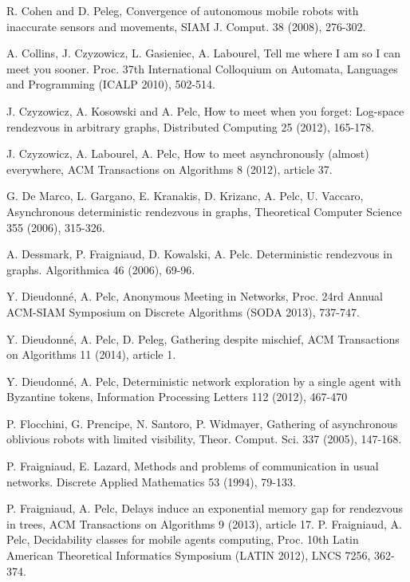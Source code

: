 \documentclass [11pt] {article}
\begin{document}
\begin{thebibliography}{99}
R. Cohen and D. Peleg, 
Convergence of autonomous mobile robots with inaccurate sensors and movements, 
SIAM J. Comput. 38 (2008), 276-302. 



A. Collins, J. Czyzowicz, L. Gasieniec, A. Labourel,
Tell me where I am so I can meet you sooner.
Proc. 37th International Colloquium on Automata, Languages and Programming (ICALP 2010), 502-514.

J. Czyzowicz, A. Kosowski and A. Pelc,
How to meet when you forget:  Log-space rendezvous in arbitrary graphs,
Distributed Computing 25 (2012), 165-178.

 J. Czyzowicz, A. Labourel, A. Pelc, How to meet asynchronously (almost) everywhere,
ACM Transactions on Algorithms 8 (2012), article 37. 
 
G. De Marco, L. Gargano, E. Kranakis, D. Krizanc, A. Pelc, U. Vaccaro,
 Asynchronous deterministic rendezvous in graphs, 
Theoretical Computer Science 355 (2006), 315-326.
 
A. Dessmark, P. Fraigniaud, D. Kowalski, A. Pelc.
Deterministic rendezvous in graphs.
Algorithmica 46 (2006), 69-96.




Y. Dieudonn\'{e}, A. Pelc, Anonymous Meeting in Networks, Proc. 24rd Annual ACM-SIAM Symposium on Discrete Algorithms (SODA 2013),  737-747.

{
Y. Dieudonn\'{e}, A. Pelc, D. Peleg, Gathering despite mischief, ACM Transactions on Algorithms 11 (2014), article 1.}

Y. Dieudonn\'{e}, A. Pelc,
Deterministic network exploration by a single agent with Byzantine tokens,
Information Processing Letters 112 (2012), 467-470

{
P. Flocchini, G. Prencipe, N. Santoro, P. Widmayer,
Gathering of asynchronous oblivious robots with limited visibility,
Theor. Comput. Sci. 337 (2005), 147-168.}

P. Fraigniaud, E. Lazard, Methods and problems of communication in usual networks. Discrete Applied Mathematics 53 (1994), 79-133.



P. Fraigniaud, A. Pelc, Delays induce an exponential memory gap for rendezvous in trees, ACM Transactions on Algorithms 9 (2013), article 17. 
P. Fraigniaud, A. Pelc, Decidability classes for mobile agents computing, Proc. 10th Latin American Theoretical Informatics Symposium (LATIN 2012), LNCS 7256, 362-374. 






\end{thebibliography}
\end{document}
